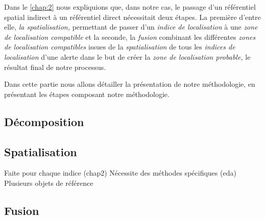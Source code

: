 Dans le \autoref{chap:2} nous expliquions que, dans notre cas, le
passage d'un référentiel spatial indirect à un référentiel direct
nécessitait deux étapes. La première d'entre elle, \emph{la
  spatialisation,} permettant de passer d'un \emph{indice de
  localisation} à une \emph{zone de localisation compatible} et la
seconde, la \emph{fusion} combinant les différentes \emph{zones de
  localisation compatibles} issues de la \emph{spatialisation} de tous
les \emph{indices de localisation} d'une alerte dans le but de créer
la \emph{zone de localisation probable,} \ie le résultat final de
notre processus.

Dans cette partie nous allons détailler la présentation de notre
méthodologie, en présentant les étapes composant notre méthodologie.

\subsection{Décomposition}

\subsection{Spatialisation}

Faite pour chaque indice (chap2)
Nécessite des méthodes spécifiques (eda)
Plusieurs objets de référence


\subsection{Fusion}


